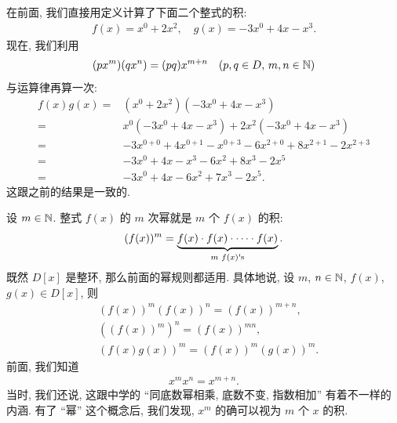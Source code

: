 \begin{example}
    在前面, 我们直接用定义计算了下面二个整式的积:
    \begin{align*}
        f(x) = x^0 + 2x^2, \quad g(x) = -3x^0 + 4x - x^3.
    \end{align*}
    现在, 我们利用
    \begin{align*}
        (px^m) (qx^n) = (pq) x^{m+n} \quad (p,q \in D, \, m,n \in \mathbb{N})
    \end{align*}
    与运算律再算一次:
    \begin{align*}
        f(x) g(x)
        = {} & (x^0 + 2x^2) (-3x^0 + 4x - x^3)                                 \\
        = {} & x^0 (-3x^0 + 4x - x^3) + 2x^2 (-3x^0 + 4x - x^3)                \\
        = {} & -3x^{0+0} + 4x^{0+1} - x^{0+3} - 6x^{2+0} + 8x^{2+1} - 2x^{2+3} \\
        = {} & -3x^0 + 4x - x^3 - 6x^2 + 8x^3 - 2x^5                           \\
        = {} & -3x^0 + 4x - 6x^2 + 7x^3 - 2x^5.
    \end{align*}
    这跟之前的结果是一致的.
\end{example}

\begin{definition}
    设 $m \in \mathbb{N}$. 整式 $f(x)$ 的 $m$ 次幂就是 $m$ 个 $f(x)$ 的积:
    \begin{align*}
        (f(x))^m = \underbrace{f(x) \cdot f(x) \cdot \cdots \cdot f(x)}_{\text{$m$ $f(x)$\apostrophe s}}.
    \end{align*}
    既然 $D[x]$ 是整环, 那么前面的幂规则都适用. 具体地说, 设 $m$, $n \in \mathbb{N}$, $f(x)$, $g(x) \in D[x]$, 则
    \begin{align*}
         & (f(x))^m (f(x))^n = (f(x))^{m+n},  \\
         & ((f(x))^m)^n = (f(x))^{mn},        \\
         & (f(x) g(x))^m = (f(x))^m (g(x))^m.
    \end{align*}
    前面, 我们知道
    \begin{align*}
        x^m x^n = x^{m+n}.
    \end{align*}
    当时, 我们还说, 这跟中学的 ``同底数幂相乘, 底数不变, 指数相加'' 有着不一样的内涵. 有了 ``幂'' 这个概念后, 我们发现, $x^m$ 的确可以视为 $m$ 个 $x$ 的积.
\end{definition}

